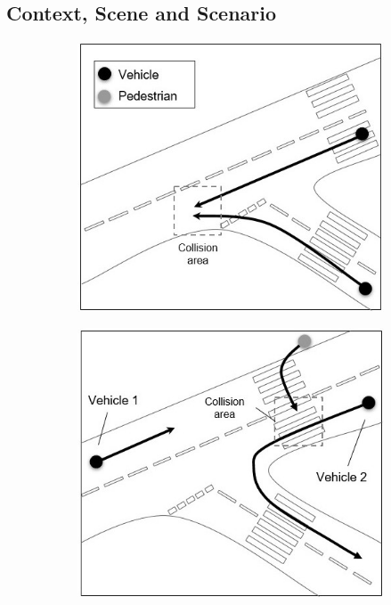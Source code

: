\subsection{Context, Scene and Scenario}\label{TestsDescriptionAndTechnicalities}
\begin{figure}[!t]
    \centering
    \begin{subfigure}{.24\textwidth}
        \includegraphics[width=1\textwidth]{../other/figures/fig3a}
        \caption{}
        \label{Test_a}
    \end{subfigure}
    \begin{subfigure}{.24\textwidth}
        \includegraphics[width=1\textwidth]{../other/figures/det_fig3bb}

\end{subfigure}
\end{figure}
